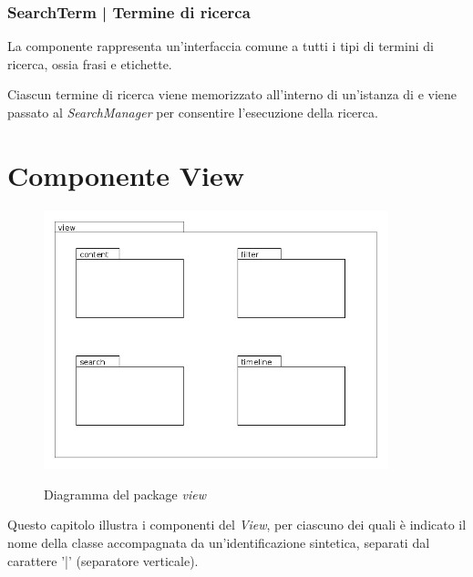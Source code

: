 \documentclass[10pt,a4paper,headinclude,footinclude,hidelinks]{scrreprt} %
\begin{document}
	\subsection[SearchTerm]{SearchTerm | Termine di ricerca}
	\label{sec:stage:design:sistema:model.search:search-term}
	La componente rappresenta un'interfaccia comune a tutti i tipi di termini di ricerca, ossia frasi e etichette.

	Ciascun termine di ricerca viene memorizzato all'interno di un'istanza di \textit{} e viene passato al \textit{SearchManager} per consentire l'esecuzione della ricerca.


	\chapter{Componente View}
	\label{ch:stage:design:view}

	\begin{figure}[ht]
		\begin{center}
	    	\includegraphics[width=10cm]{package/view.png}
			\label{gfx:package:view}
			\caption{Diagramma del package \textit{view}}
		\end{center}
	\end{figure}

	Questo capitolo illustra i componenti del \textit{View}, per ciascuno dei quali è indicato il nome della classe accompagnata da un'identificazione sintetica, separati dal carattere '|' (separatore verticale).
\end{document}
